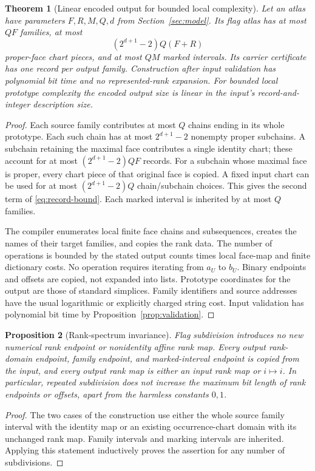 \documentclass[11pt]{article}
\newtheorem{theorem}{Theorem}[section]
\newtheorem{proposition}[theorem]{Proposition}
\theoremstyle{definition}\newtheorem{definition}[theorem]{Definition}
\theoremstyle{remark}\newtheorem{remark}[theorem]{Remark}
\begin{document}
\begin{theorem}[Linear encoded output for bounded local complexity]\label{thm:size}
Let an atlas have parameters \(F,R,M,Q,d\) from Section~\ref{sec:model}. Its flag atlas has at most \(QF\) families, at most
\begin{equation}\label{eq:record-bound}
                    (2^{d+1}-2)Q(F+R)
\end{equation}
proper-face chart pieces, and at most \(QM\) marked intervals. Its carrier certificate has one record per output family. Construction after input validation has polynomial bit time and no represented-rank expansion. For bounded local prototype complexity the encoded output size is linear in the input's record-and-integer description size.
\end{theorem}
\begin{proof}
Each source family contributes at most \(Q\) chains ending in its whole prototype. Each such chain has at most \(2^{d+1}-2\) nonempty proper subchains. A subchain retaining the maximal face contributes a single identity chart; these account for at most \((2^{d+1}-2)QF\) records. For a subchain whose maximal face is proper, every chart piece of that original face is copied. A fixed input chart can be used for at most \((2^{d+1}-2)Q\) chain/subchain choices. This gives the second term of \eqref{eq:record-bound}. Each marked interval is inherited by at most \(Q\) families.

The compiler enumerates local finite face chains and subsequences, creates the names of their target families, and copies the rank data. The number of operations is bounded by the stated output counts times local face-map and finite dictionary costs. No operation requires iterating from \(a_U\) to \(b_U\). Binary endpoints and offsets are copied, not expanded into lists. Prototype coordinates for the output are those of standard simplices. Family identifiers and source addresses have the usual logarithmic or explicitly charged string cost. Input validation has polynomial bit time by Proposition~\ref{prop:validation}.
\end{proof}

\begin{proposition}[Rank-spectrum invariance]\label{prop:rank-spectrum}
Flag subdivision introduces no new numerical rank endpoint or nonidentity affine rank map. Every output rank-domain endpoint, family endpoint, and marked-interval endpoint is copied from the input, and every output rank map is either an input rank map or \(i\mapsto i\). In particular, repeated subdivision does not increase the maximum bit length of rank endpoints or offsets, apart from the harmless constants \(0,1\).
\end{proposition}
\begin{proof}
The two cases of the construction use either the whole source family interval with the identity map or an existing occurrence-chart domain with its unchanged rank map. Family intervals and marking intervals are inherited. Applying this statement inductively proves the assertion for any number of subdivisions.
\end{proof}
\end{document}
